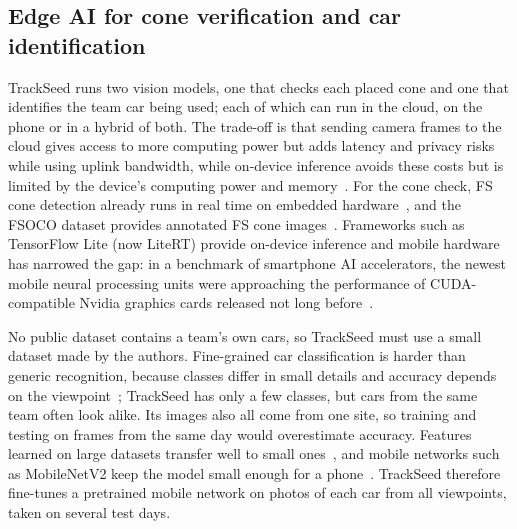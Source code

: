 \subsection{Edge AI for cone verification and car identification}
TrackSeed runs two vision models, one that checks each placed cone and one that identifies the team car being used; each of which can run in the cloud, on the phone or in a hybrid of both. The trade-off is that sending camera frames to the cloud gives access to more computing power but adds latency and privacy risks while using uplink bandwidth, while on-device inference avoids these costs but is limited by the device's computing power and memory~\cite{chen2019}. For the cone check, FS cone detection already runs in real time on embedded hardware~\cite{dhall2019}, and the FSOCO dataset provides annotated FS cone images~\cite{vodisch2022}. Frameworks such as TensorFlow Lite (now LiteRT) provide on-device inference and mobile hardware has narrowed the gap: in a benchmark of smartphone AI accelerators, the newest mobile neural processing units were approaching the performance of CUDA-compatible Nvidia graphics cards released not long before~\cite{ignatov2019}.

No public dataset contains a team's own cars, so TrackSeed must use a small dataset made by the authors. Fine-grained car classification is harder than generic recognition, because classes differ in small details and accuracy depends on the viewpoint~\cite{yang2015}; TrackSeed has only a few classes, but cars from the same team often look alike. Its images also all come from one site, so training and testing on frames from the same day would overestimate accuracy. Features learned on large datasets transfer well to small ones~\cite{yosinski2014}, and mobile networks such as MobileNetV2 keep the model small enough for a phone~\cite{sandler2018}. TrackSeed therefore fine-tunes a pretrained mobile network on photos of each car from all viewpoints, taken on several test days.

